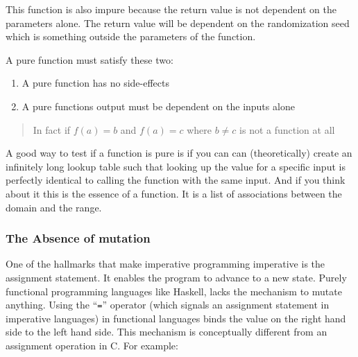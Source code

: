 This function is also impure because the return value is not dependent
on the parameters alone. The return value will be dependent on the
randomization seed which is something outside the parameters of the
function.

A pure function must satisfy these two:

\begin{enumerate}
\def\labelenumi{\arabic{enumi}.}
\tightlist
\item
  A pure function has no side-effects
\item
  A pure functions output must be dependent on the inputs alone
\end{enumerate}

\begin{quote}
In fact if \(f(a)=b\) and \(f(a)=c\) where \(b\neq c\) is not a function
at all
\end{quote}

A good way to test if a function is pure is if you can can
(theoretically) create an infinitely long lookup table such that looking
up the value for a specific input is perfectly identical to calling the
function with the same input. And if you think about it this is the
essence of a function. It is a list of associations between the domain
and the range.

\subsubsection{The Absence of
mutation}\label{functional-programming-paradigm.md__the-absence-of-mutation}

One of the hallmarks that make imperative programming imperative is the
assignment statement. It enables the program to advance to a new state.
Purely functional programming languages like Haskell, lacks the
mechanism to mutate anything. Using the ``\texttt{=}'' operator (which
signals an assignment statement in imperative languages) in functional
languages binds the value on the right hand side to the left hand side.
This mechanism is conceptually different from an assignment operation in
C. For example:

\begin{Shaded}
\begin{Highlighting}[]
\OperatorTok{=} \OperatorTok{;}
\OperatorTok{=} \OperatorTok{;}
\end{Highlighting}
\end{Shaded}


